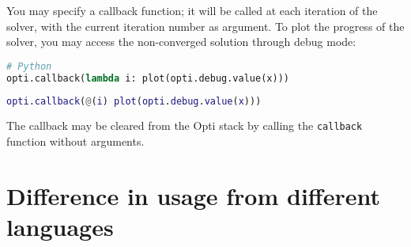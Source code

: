 \documentclass[a4paper,12pt]{book}
\begin{document}
You may specify a callback function; it will be called at each iteration of the solver, with the current iteration number as argument.
To plot the progress of the solver, you may access the non-converged solution through debug mode:\\
\begin{lstlisting}[language=Python]
# Python
opti.callback(lambda i: plot(opti.debug.value(x)))
\end{lstlisting}
\begin{lstlisting}[language=Matlab]
% MATLAB/Octave
opti.callback(@(i) plot(opti.debug.value(x)))
\end{lstlisting}
The callback may be cleared from the Opti stack by calling the \texttt{callback} function without arguments.


\chapter{Difference in usage from different languages} \label{ch:syntax_differences}
\end{document}
